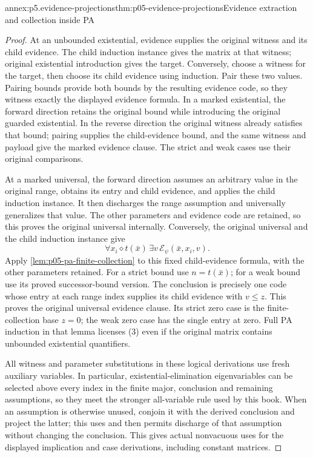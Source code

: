 \begin{annexitem}{annex:p5.evidence-projections}{thm:p05-evidence-projections}{Evidence extraction and collection inside PA}
\begin{proof}
At an unbounded existential, evidence supplies the original witness and
its child evidence. The child induction instance gives the matrix at that
witness; original existential introduction gives the target. Conversely,
choose a witness for the target, then choose its child evidence using
induction. Pair these two values. Pairing bounds provide both bounds by
the resulting evidence code, so they witness exactly the displayed
evidence formula. In a marked existential, the forward direction retains
the original bound while introducing the original guarded existential.
In the reverse direction the original witness already satisfies that
bound; pairing supplies the child-evidence bound, and the same witness
and payload give the marked evidence clause. The strict and weak cases
use their original comparisons.

At a marked universal, the forward direction assumes an arbitrary value
in the original range, obtains its entry and child evidence, and applies
the child induction instance. It then discharges the range assumption
and universally generalizes that value. The other parameters and evidence
code are retained, so this proves the original universal internally.
Conversely, the original universal and the child induction instance give
\[
       \forall x_i\mathrel\diamond t(\bar x)\,
                       \exists v\,\mathcal E_\psi(\bar x,x_i,v).
\tag{3}
\]
Apply \cref{lem:p05-pa-finite-collection} to this fixed child-evidence
formula, with the other parameters retained. For a strict bound use
\(n=t(\bar x)\); for a weak bound use its proved successor-bound
version. The conclusion is precisely one code whose entry at each range
index supplies its child evidence with \(v\leq z\). This proves
the original universal evidence clause. Its strict zero case is the
finite-collection base \(z=0\); the weak zero case has the single
entry at zero. Full PA induction in that lemma licenses (3) even if the
original matrix contains unbounded existential quantifiers.

All witness and parameter substitutions in these logical derivations use
fresh auxiliary variables. In particular, existential-elimination
eigenvariables can be selected above every index in the finite major,
conclusion and remaining assumptions, so they meet the stronger
all-variable rule used by this book. When an assumption is otherwise
unused, conjoin it with the derived conclusion and project the latter;
this uses and then permits discharge of that assumption without changing
the conclusion. This gives actual nonvacuous uses for the displayed
implication and case derivations, including constant matrices.


\end{proof}
\end{annexitem}
